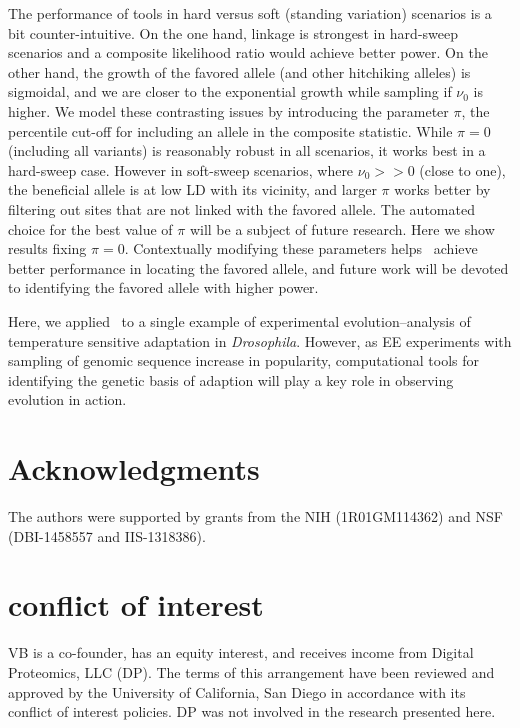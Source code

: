 \documentclass[11pt]{article}
\def\comale{\text{{\sc Comale}}}
\begin{document}
The performance of tools in hard versus soft (standing variation)
scenarios is a bit counter-intuitive. On the one hand, linkage is
strongest in hard-sweep scenarios and a composite likelihood ratio
would achieve better power. On the other hand, the growth of the
favored allele (and other hitchiking alleles) is sigmoidal, and we are
closer to the exponential growth while sampling if $\nu_0$ is
higher. We model these contrasting issues by introducing the parameter
$\pi$, the percentile cut-off for including an allele in the composite
statistic. While $\pi=0$ (including all variants) is reasonably robust
in all scenarios, it works best in a hard-sweep case. However in
soft-sweep scenarios, where $\nu_0>>0$ (close to one), the beneficial
allele is at low LD with its vicinity, and larger $\pi$ works better
by filtering out sites that are not linked with the favored
allele. The automated choice for the best value of $\pi$ will be a
subject of future research. Here we show results fixing
$\pi=0$. Contextually modifying these parameters helps \comale\
achieve better performance in locating the favored allele, and future
work will be devoted to identifying the favored allele with higher
power.

Here, we applied \comale\ to a single example of experimental
evolution--analysis of temperature sensitive adaptation in
\emph{Drosophila}. However, as EE experiments with sampling of genomic
sequence increase in popularity, computational tools for identifying
the genetic basis of adaption will play a key role in observing
evolution in action.
	



\section*{Acknowledgments}
The authors were supported by grants from the NIH (1R01GM114362) and
NSF (DBI-1458557 and IIS-1318386).

\section*{conflict of interest}
VB is a co-founder, has an equity interest, and receives income from
Digital Proteomics, LLC (DP).  The terms of this arrangement have been
reviewed and approved by the University of California, San Diego in
accordance with its conflict of interest policies.  DP was not
involved in the research presented here.
\end{document}
